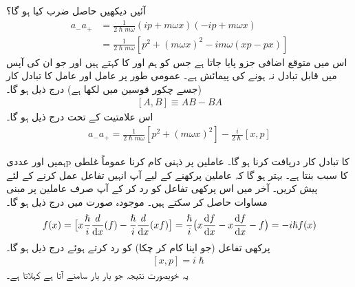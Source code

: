 آئیں دیکھیں حاصل ضرب   کیا ہو گا؟
\begin{align*}
a_{-}a_{+}&=\frac{1}{2\hslash m\omega}(ip+m\omega x)(-ip+m\omega x)\\
&=\frac{1}{2\hslash m\omega}[p^{2}+(m\omega x)^{2}-im\omega(xp-px)]
\end{align*}
اس میں متوقع اضافی جزو  پایا جاتا ہے جس کو ہم  اور  کا   کہتے ہیں اور جو ان کی آپس میں قابل تبادل نہ  ہونے کی پیمائش ہے۔ عمومی طور پر عامل  اور عامل  کا تبادل کار (جسے چکور  قوسین میں لکھا ہے) درج ذیل ہو گا۔
\begin{align}\label{مساوات_غیر_تابع_شروڈنگر_تبادل_کار}
[A,B]\equiv AB-BA
\end{align}
اس علامتیت کے تحت درج ذیل ہو گا۔
\begin{align}\label{مساوات_شروڈنگر_سیڑھی_حاصل_ضرب}
a_{-}a_{+}=\frac{1}{2\hslash m\omega}[p^{2}+(m\omega x)^{2}]-\frac{i}{2\hslash}[x,p]
\end{align}

ہمیں  اور  عددی{p} کا تبادل کار دریافت کرنا ہو گا۔  عاملین پر ذہنی  کام کرنا  عموماً غلطی کا سبب بنتا ہے۔ بہتر ہو گا کہ  عاملین پرکھنے کے لیے آپ انہیں تفاعل  عمل کرنے کے لئے پیش کریں۔ آخر میں اس پرکھی تفاعل کو رد کر کے آپ صرف عاملین پر مبنی مساوات حاصل کر سکتے ہیں۔ موجودہ صورت میں درج ذیل ہو گا۔
\begin{align}
[x,p]f(x)=\big[x\frac{\hslash}{i}\frac{d}{\dif{x}}(f)-\frac{\hslash}{i}\frac{d}{\dif{x}}(xf)\big ]=\frac{\hslash}{i}\big (x\frac{\dif{f}}{\dif{x}}-x\frac{\dif{f}}{\dif{x}}-f\big )=-i\hslash f(x)
\end{align}
پرکھی تفاعل (جو اپنا کام کر چکا) کو رد کرتے ہوئے درج ذیل ہو گا۔
\begin{align}\label{مساوات_غیر_تابع_شروڈنگر_مقام_معیار_حرکت_تبادل_کار}
[x,p]=i\hslash
\end{align}
یہ خوبصورت نتیجہ جو بار بار سامنے آتا ہے  کہلاتا ہے۔

